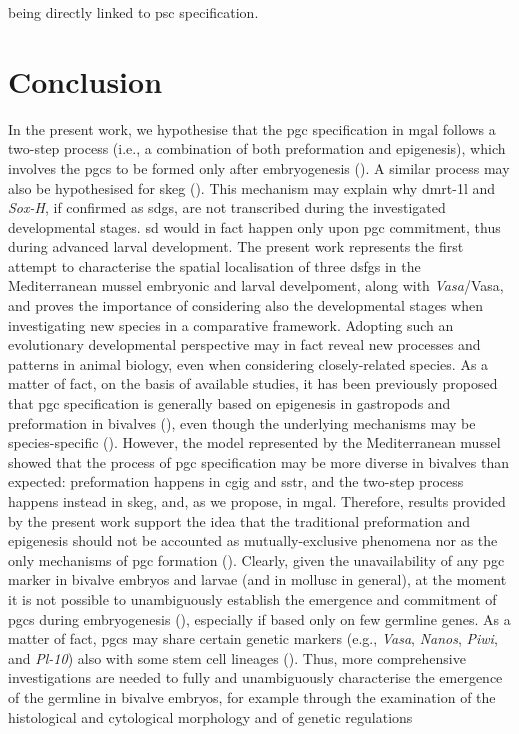 being directly linked to \gls{psc} specification.

\section{Conclusion}\label{chapter:insitu-conclusions}
In the present work, we hypothesise that the \gls{pgc} specification in \gls{mgal} follows a two-step process (i.e., a combination of both preformation and epigenesis), which involves the \glspl{pgc} to be formed only after embryogenesis (). A similar process may also be hypothesised for \gls{skeg} (). This mechanism may explain why \gls{dmrt-1l} and \textit{Sox-H}, if confirmed as \glspl{sdg}, are not transcribed during the investigated developmental stages. \gls{sd} would in fact happen only upon \gls{pgc} commitment, thus during advanced larval development. The present work represents the first attempt to characterise the spatial localisation of three \glspl{dsfg} in the Mediterranean mussel embryonic and larval develpoment, along with \textit{Vasa}/Vasa, and proves the importance of considering also the developmental stages when investigating new species in a comparative framework. Adopting such an evolutionary developmental perspective may in fact reveal new processes and patterns in animal biology, even when considering closely-related species. As a matter of fact, on the basis of available studies, it has been previously proposed that \gls{pgc} specification is generally based on epigenesis in gastropods and preformation in bivalves (), even though the underlying mechanisms may be species-specific (). However, the model represented by the Mediterranean mussel showed that the process of \gls{pgc} specification may be more diverse in bivalves than expected: preformation happens in \gls{cgig} and \gls{sstr}, and the two-step process happens instead in \gls{skeg}, and, as we propose, in \gls{mgal}. Therefore, results provided by the present work support the idea that the traditional preformation and epigenesis should not be accounted as mutually-exclusive phenomena nor as the only mechanisms of \gls{pgc} formation (). Clearly, given the unavailability of any \gls{pgc} marker in bivalve embryos and larvae (and in mollusc in general), at the moment it is not possible to unambiguously establish the emergence and commitment of \glspl{pgc} during embryogenesis (), especially if based only on few germline genes. As a matter of fact, \glspl{pgc} may share certain genetic markers (e.g., \textit{Vasa}, \textit{Nanos}, \textit{Piwi}, and \textit{Pl-10}) also with some stem cell lineages (). Thus, more comprehensive investigations are needed to fully and unambiguously characterise the emergence of the germline in bivalve embryos, for example through the examination of the histological and cytological morphology and of genetic regulations 
